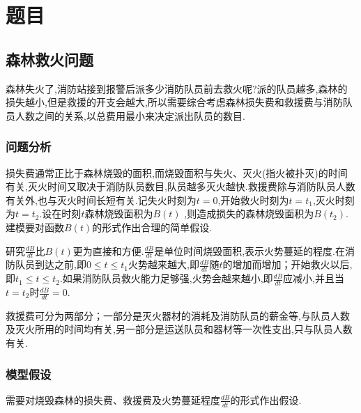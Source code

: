 \documentclass[UTF8]{article}
\begin{document}
    
    \section{题目}
    
    \subsection*{森林救火问题}

        森林失火了,消防站接到报警后派多少消防队员前去救火呢?派的队员越多,森林的损失越小,但是救援的开支会越大,所以需要综合考虑森林损失费和救援费与消防队员人数之间的关系,以总费用最小来决定派出队员的数目.

    \subsubsection*{问题分析}
        
        损失费通常正比于森林烧毁的面积,而烧毁面积与失火、灭火(指火被扑灭)的时间有关,灭火时间又取决于消防队员数目,队员越多灭火越快.救援费除与消防队员人数有关外,也与灭火时间长短有关.记失火时刻为$t=0$,开始救火时刻为$t=t_1$,灭火时刻为$t=t_2$.设在时刻$t$森林烧毁面积为$B(t)$ ,则造成损失的森林烧毁面积为$B(t_2)$.建模要对函数$B(t)$的形式作出合理的简单假设.
    
        研究$\frac{dB}{dt}$比$B(t)$更为直接和方便.$\frac{dB}{dt}$是单位时间烧毁面积,表示火势蔓延的程度.在消防队员到达之前,即$0 \leqslant t \leqslant t_1$火势越来越大,即$\frac{dB}{dt}$随$t$的增加而增加；开始救火以后,即$t_1 \leqslant t \leqslant t_2$.如果消防队员救火能力足够强,火势会越来越小,即$\frac{dB}{dt}$应减小,并且当$t=t_2$时$\frac{dB}{dt}=0$.

        救援费可分为两部分；一部分是灭火器材的消耗及消防队员的薪金等,与队员人数及灭火所用的时间均有关,另一部分是运送队员和器材等一次性支出,只与队员人数有关.
    
    \subsubsection*{模型假设}
        
        需要对烧毁森林的损失费、救援费及火势蔓延程度$\frac{dB}{dt}$的形式作出假设.
\end{document}
